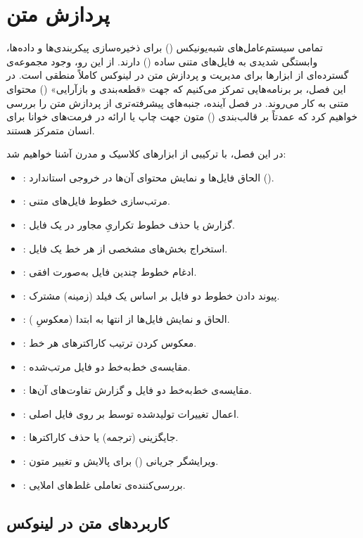 \chapter{پردازش متن}

تمامی سیستم‌عامل‌های شبه‌یونیکس () برای ذخیره‌سازی پیکربندی‌ها و داده‌ها، وابستگی شدیدی به فایل‌های متنی ساده () دارند. از این رو، وجود مجموعه‌ی گسترده‌ای از ابزارها برای مدیریت و پردازش متن در لینوکس کاملاً منطقی است. در این فصل، بر برنامه‌هایی تمرکز می‌کنیم که جهت «قطعه‌بندی و بازآرایی» () محتوای متنی به کار می‌روند. در فصل آینده، جنبه‌های پیشرفته‌تری از پردازش متن را بررسی خواهیم کرد که عمدتاً بر قالب‌بندی () متون جهت چاپ یا ارائه در فرمت‌های خوانا برای انسان متمرکز هستند.

در این فصل، با ترکیبی از ابزارهای کلاسیک و مدرن آشنا خواهیم شد:

\begin{itemize}
  \item {}: الحاق فایل‌ها و نمایش محتوای آن‌ها در خروجی استاندارد ().
  \item {}: مرتب‌سازی خطوط فایل‌های متنی.
  \item {}: گزارش یا حذف خطوط تکراریِ مجاور در یک فایل.
  \item {}: استخراج بخش‌های مشخصی از هر خط یک فایل.
  \item {}: ادغام خطوط چندین فایل به‌صورت افقی.
  \item {}: پیوند دادن خطوط دو فایل بر اساس یک فیلد (زمینه) مشترک.
  \item {}: الحاق و نمایش فایل‌ها از انتها به ابتدا (معکوسِ ).
  \item {}: معکوس کردن ترتیب کاراکترهای هر خط.
  \item {}: مقایسه‌ی خط‌به‌خط دو فایل مرتب‌شده.
  \item {}: مقایسه‌ی خط‌به‌خط دو فایل و گزارش تفاوت‌های آن‌ها.
  \item {}: اعمال تغییرات تولیدشده توسط  بر روی فایل اصلی.
  \item {}: جایگزینی (ترجمه) یا حذف کاراکترها.
  \item {}: ویرایشگر جریانی () برای پالایش و تغییر متون.
  \item {}: بررسی‌کننده‌ی تعاملی غلط‌های املایی.
\end{itemize}

\section{کاربردهای متن در لینوکس}

